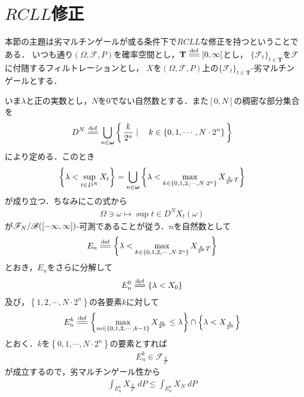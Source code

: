 \section{$RCLL$修正}
	本節の主題は劣マルチンゲールが或る条件下で$RCLL$な修正を持つということである．
	いつも通り$(\Omega,\mathscr{F},P)$を確率空間とし，$\mathbf{T} \defeq [0,\infty[$とし，
	$\{\mathscr{F}_t\}_{t \in \mathbf{T}}$を$\mathscr{F}$に付随するフィルトレーションとし，
	$X$を$(\Omega,\mathscr{F},P)$上の$\{\mathscr{F}_t\}_{t \in \mathbf{T}}$-劣マルチンゲールとする．
	
	いま$\lambda$と正の実数とし，$N$を$0$でない自然数とする．また$[0,N]$の稠密な部分集合を
	\begin{align}
		D^N \defeq \bigcup_{n \in \Natural} \Set{\frac{k}{2^n}}{k \in \{0,1,\cdots,N \cdot 2^n\}}
	\end{align}
	により定める．このとき
	\begin{align}
		\left\{\lambda < \operatorname*{sup}_{t \in D^N} X_t\right\}
		= \bigcup_{n \in {\boldsymbol \omega}} \left\{\lambda < \max_{k \in \left\{0,1,2,\cdots,N \cdot 2^n\right\}} X_{\frac{k}{2^n}T}\right\}
	\end{align}
	が成り立つ．ちなみにこの式から
	\begin{align}
		\Omega \ni \omega \longmapsto \sup{t \in D^N}X_t(\omega)
	\end{align}
	が$\mathscr{F}_N/\mathscr{B}([-\infty,\infty])$-可測であることが従う．$n$を自然数として
	\begin{align}
		E_n \defeq  \left\{\lambda < \max_{k \in \left\{0,1,2,\cdots,N \cdot 2^n\right\}} X_{\frac{k}{2^n}T}\right\}
	\end{align}
	とおき，$E_n$をさらに分解して
	\begin{align}
		E_n^0 \defeq \left\{\lambda < X_0\right\}
	\end{align}
	及び，$\left\{1,2,\cdots,N \cdot 2^n\right\}$の各要素$k$に対して
	\begin{align}
		E_n^k \defeq \left\{ \max_{m \in \left\{0,1,2,\cdots,k-1\right\}} X_{\frac{m}{2^n}} \leq \lambda \right\} \cap \left\{\lambda < X_{\frac{k}{2^n}}\right\}
	\end{align}
	とおく．$k$を$\left\{0,1,\cdots,N \cdot 2^n\right\}$の要素とすれば
	\begin{align}
		E_n^k \in \mathscr{F}_{\frac{k}{2^n}}
	\end{align}
	が成立するので，劣マルチンゲール性から
	\begin{align}
		\int_{E_n^k} X_{\frac{k}{2^n}}\ dP \leq \int_{E_n^k} X_N\ dP
	\end{align}
